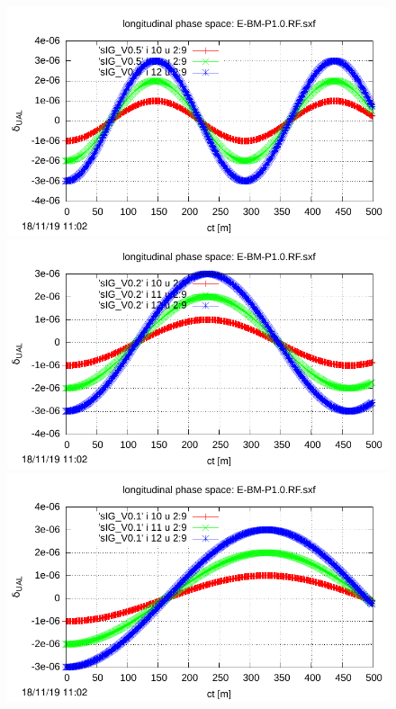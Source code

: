 \documentclass[]{article}
\begin{document}
\begin{figure}[h]
\begin{minipage}[b]{0.45\linewidth}
\end{minipage}
%
%
\begin{minipage}[b]{0.45\linewidth}
\centering
\includegraphics[scale=0.55]{pdf/delta_vs_turn_V0p5.pdf}
\end{minipage}
%
%
\begin{minipage}[b]{0.45\linewidth}
\centering
\includegraphics[scale=0.55]{pdf/delta_vs_turn_V0p2.pdf}
\end{minipage}
%
\hskip 1cm
%
\begin{minipage}[b]{0.45\linewidth}
\centering
\includegraphics[scale=0.55]{pdf/delta_vs_turn_V0p1.pdf}

\end{minipage}
\end{figure}
\end{document}
